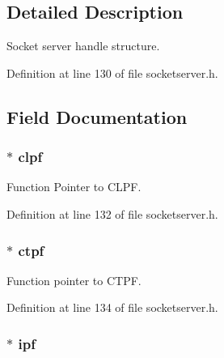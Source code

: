 \subsection{Detailed Description}
Socket server handle structure. 

Definition at line 130 of file socketserver.\-h.



\subsection{Field Documentation}
\hypertarget{struct_s_s_r_v_r___h_a_n_d_l_e_a34f592a823c507852003bb2c264ce03f}{
\subsubsection[{clpf}]{$\ast$ clpf}}\label{struct_s_s_r_v_r___h_a_n_d_l_e_a34f592a823c507852003bb2c264ce03f}


Function Pointer to C\-L\-P\-F. 



Definition at line 132 of file socketserver.\-h.

\hypertarget{struct_s_s_r_v_r___h_a_n_d_l_e_ac67dbc58c3fe660c864609ada9042623}{
\subsubsection[{ctpf}]{$\ast$ ctpf}}\label{struct_s_s_r_v_r___h_a_n_d_l_e_ac67dbc58c3fe660c864609ada9042623}


Function pointer to C\-T\-P\-F. 



Definition at line 134 of file socketserver.\-h.

\hypertarget{struct_s_s_r_v_r___h_a_n_d_l_e_a012af24eff075dda0e6bec0dbe686821}{
\subsubsection[{ipf}]{$\ast$ ipf}}\label{struct_s_s_r_v_r___h_a_n_d_l_e_a012af24eff075dda0e6bec0dbe686821}


